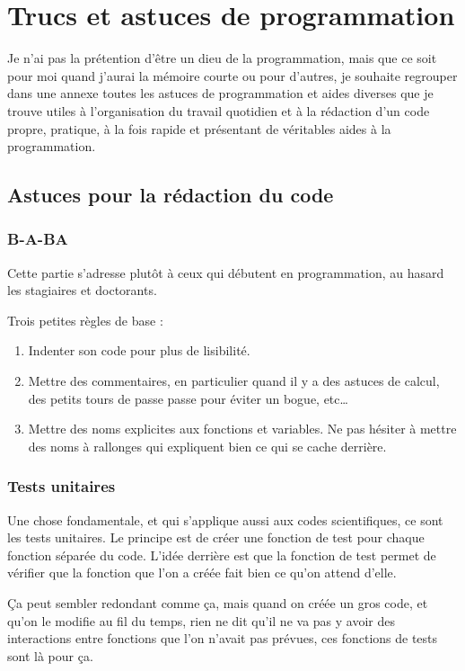 \chapter{Trucs et astuces de programmation}
Je n'ai pas la prétention d'être un dieu de la programmation, mais que ce soit pour moi quand j'aurai la mémoire courte ou pour d'autres, je souhaite regrouper dans une annexe toutes les astuces de programmation et aides diverses que je trouve utiles à l'organisation du travail quotidien et à la rédaction d'un code propre, pratique, à la fois rapide et présentant de véritables aides à la programmation. 


\section{Astuces pour la rédaction du code}
\subsection{B-A-BA}
Cette partie s'adresse plutôt à ceux qui débutent en programmation, au hasard les stagiaires et doctorants. 

Trois petites règles de base : 
\begin{enumerate}
\item Indenter son code pour plus de lisibilité.
\item Mettre des commentaires, en particulier quand il y a des astuces de calcul, des petits tours de passe passe pour éviter un bogue, etc\dots
\item Mettre des noms explicites aux fonctions et variables. Ne pas hésiter à mettre des noms à rallonges qui expliquent bien ce qui se cache derrière. 
\end{enumerate}

\subsection{Tests unitaires}
Une chose fondamentale, et qui s'applique aussi aux codes scientifiques, ce sont les tests unitaires. Le principe est de créer une fonction de test pour chaque fonction séparée du code. L'idée derrière est que la fonction de test permet de vérifier que la fonction que l'on a créée fait bien ce qu'on attend d'elle. 

Ça peut sembler redondant comme ça, mais quand on créée un gros code, et qu'on le modifie au fil du temps, rien ne dit qu'il ne va pas y avoir des interactions entre fonctions que l'on n'avait pas prévues, ces fonctions de tests sont là pour ça. 

